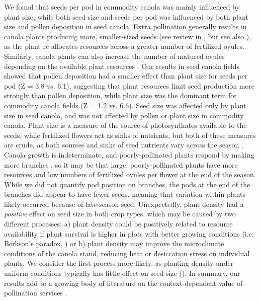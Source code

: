 \documentclass[12pt]{article} %
\begin{document}

We found that seeds per pod in commodity canola was mainly influenced by plant size, while both seed size and seeds per pod was influenced by both plant size and pollen deposition in seed canola. 
Extra pollination generally results in canola plants producing more, smaller-sized seeds (see review in \citealt{ouvrard2019}, but see also \citealt{koltowski2005}), as the plant re-allocates resources across a greater number of fertilized ovules.
Similarly, canola plants can also increase the number of matured ovules depending on the available plant resources \citep{bouttier1992, kirkegaard2018}.
Our results in seed canola fields showed that pollen deposition had a smaller effect than plant size for seeds per pod (Z = 3.8 vs. 6.1), suggesting that plant resources limit seed production more strongly than pollen deposition, while plant size was the dominant term for commodity canola fields (Z = 1.2 vs. 6.6).
Seed size was affected only by plant size in seed canola, and was not affected by pollen or plant size in commodity canola. 
Plant size is a measure of the source of photosynthates available to the seeds, while fertilized flowers act as sinks of nutrients, but both of these measures are crude, as both sources and sinks of seed nutrients vary across the season \citep{clarke1979, zhang2018}.
Canola growth is indeterminate, and poorly-pollinated plants respond by making more branches \citep{mesquida1981, sabbahi2006}, so it may be that large, poorly-pollinated plants have more resources and low numbers of fertilized ovules per flower at the end of the season.
While we did not quantify pod position on branches, the pods at the end of the branches did appear to have fewer seeds, meaning that variation within plants likely occurred because of late-season seed.
Unexpectedly, plant density had a \emph{positive} effect on seed size in both crop types, which may be caused by two different processes: a) plant density could be positively related to resource availability if plant survival is higher in plots with better growing conditions (i.e. Berkson's paradox, \citep{snoep2014}) or b) plant density may improve the microclimate conditions of the canola stand, reducing heat or desiccation stress on individual plants.
We consider the first process more likely, as planting density under uniform conditions typically has little effect on seed size (\citealt{Angadi2003}).
In summary, our results add to a growing body of literature on the context-dependent value of pollination services \citep{marini2015, tamburini2017, tamburini2019}.
\end{document}
